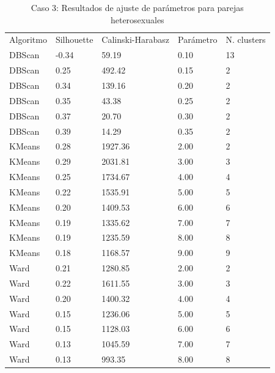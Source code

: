 \documentclass[11pt,a4paper]{article}
\begin{document}
	\begin{table}[]
		\centering
		\caption{Caso 3: Resultados de ajuste de parámetros para parejas heterosexuales} \label{tablaComparativa3} 
		\begin{tabular}{lllll}
			Algoritmo & Silhouette  & Calinski-Harabasz & Parámetro & N. clusters \\
			DBScan    & -0.34 & 59.19             & 0.10       & 13          \\
			DBScan    & 0.25  & 492.42            & 0.15       & 2           \\
			DBScan    & 0.34  & 139.16            & 0.20       & 2           \\
			DBScan    & 0.35  & 43.38             & 0.25       & 2           \\
			DBScan    & 0.37  & 20.70             & 0.30       & 2           \\
			DBScan    & 0.39  & 14.29             & 0.35       & 2           \\
			KMeans    & 0.28  & 1927.36           & 2.00       & 2           \\
			KMeans    & 0.29  & 2031.81           & 3.00       & 3           \\
			KMeans    & 0.25  & 1734.67           & 4.00       & 4           \\
			KMeans    & 0.22  & 1535.91           & 5.00       & 5           \\
			KMeans    & 0.20  & 1409.53           & 6.00       & 6           \\
			KMeans    & 0.19  & 1335.62           & 7.00       & 7           \\
			KMeans    & 0.19  & 1235.59           & 8.00       & 8           \\
			KMeans    & 0.18  & 1168.57           & 9.00       & 9           \\
			Ward      & 0.21  & 1280.85           & 2.00       & 2           \\
			Ward      & 0.22  & 1611.55           & 3.00       & 3           \\
			Ward      & 0.20  & 1400.32           & 4.00       & 4           \\
			Ward      & 0.15  & 1236.06           & 5.00       & 5           \\
			Ward      & 0.15  & 1128.03           & 6.00       & 6           \\
			Ward      & 0.13  & 1045.59           & 7.00       & 7           \\
			Ward      & 0.13  & 993.35            & 8.00       & 8           \\

\end{tabular}
\end{table}
\end{document}
